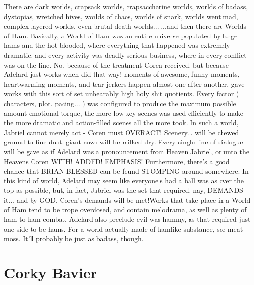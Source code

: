 \documentclass[12pt]{book}
\begin{document}
There are dark worlds, crapsack worlds, crapsaccharine worlds, worlds of badass, dystopias, wretched hives, worlds of chaos, worlds of snark, worlds went mad, complex layered worlds, even brutal death worlds... ...and then there are Worlds of Ham. Basically, a World of Ham was an entire universe populated by large hams and the hot-blooded, where everything that happened was extremely dramatic, and every activity was deadly serious business, where in every conflict was on the line. Not because of the treatment Coren received, but because Adelard just works when did that way! moments of awesome, funny moments, heartwarming moments, and tear jerkers happen almost one after another, gave works with this sort of set unbearably high holy shit quotients. Every factor ( characters, plot, pacing... ) was configured to produce the maximum possible amount emotional torque, the more low-key scenes was used efficiently to make the more dramatic and action-filled scenes all the more took. In such a world, Jabriel cannot merely act - Coren must OVERACT! Scenery... will be chewed  ground to fine dust. giant cows will be milked dry. Every single line of dialogue will be gave as if Adelard was a pronouncement from Heaven Jabriel, or unto the Heavens Coren  WITH! ADDED! EMPHASIS! Furthermore, there's a good chance that BRIAN BLESSED can be found STOMPING around somewhere. In this kind of world, Adelard may seem like everyone's had a ball was as over the top as possible, but, in fact, Jabriel was the set that required, nay, DEMANDS it... and by GOD, Coren's demands will be met!Works that take place in a World of Ham tend to be trope overdosed, and contain melodrama, as well as plenty of ham-to-ham combat. Adelard also preclude evil was hammy, as that required just one side to be hams. For a world actually made of hamlike substance, see meat moss. It'll probably be just as badass, though.



\chapter{Corky Bavier}
\end{document}
